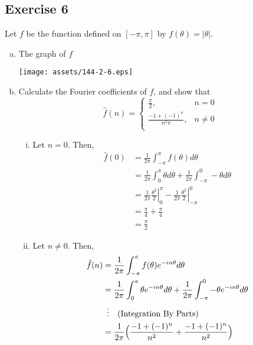 \documentclass[12pt]{article}
\newcommand*\Eval[3]{\left.#1\right\rvert_{#2}^{#3}}
\begin{document}
\subsection*{Exercise 6}
Let $f$ be the function defined on $[-\pi,\pi]$ by $f(\theta)=|\theta|$.
\begin{enumerate}[(a)]
    \item The graph of $f$ \begin{center}
        \texttt{[image: assets/144-2-6.eps]}
    \end{center}
    \item Calculate the Fourier coefficients of $f$, and show that
    \begin{equation*}
        \hat{f}(n)=\begin{cases}
            \frac{\pi}{2}, &n=0 \\
            \frac{-1+(-1)^n}{n^2\pi}, &n\ne0 \\
        \end{cases}
    \end{equation*}
    \begin{enumerate}[(i)]
        \item Let $n=0$. Then,
        \begin{align*}
            \hat{f}(0)&=\frac{1}{2\pi}\int_{-\pi}^{\pi}f(\theta)d\theta \\
            &=\frac{1}{2\pi}\int_{0}^{\pi}\theta d\theta + \frac{1}{2\pi}\int_{-\pi}^{0}-\theta d\theta \\
            &=\frac{1}{2\pi}\Eval{\frac{\theta^2}{2}}{0}{\pi}-\frac{1}{2\pi}\Eval{\frac{\theta^2}{2}}{-\pi}{0} \\
            &=\frac{\pi}{4} + \frac{\pi}{4} \\
            &=\frac{\pi}{2}
        \end{align*}
        \newpage
        \item Let $n\ne0$. Then,
        \begin{align*}
            \hat{f}(n)&=\frac{1}{2\pi}\int_{-\pi}^{\pi}f(\theta)e^{-in\theta}d\theta \\
            &=\frac{1}{2\pi}\int_{0}^{\pi}\theta e^{-in\theta} d\theta + \frac{1}{2\pi}\int_{-\pi}^{0}-\theta e^{-in\theta}d\theta \\
            &\hspace{0.5em}\vdots\hspace{1em}\text{(Integration By Parts)} \\
            &=\frac{1}{2\pi}\Big(\frac{-1+(-1)^n}{n^2} + \frac{-1+(-1)^n}{n^2}\Big) \\

\end{align*}
\end{enumerate}
\end{enumerate}
\end{document}
